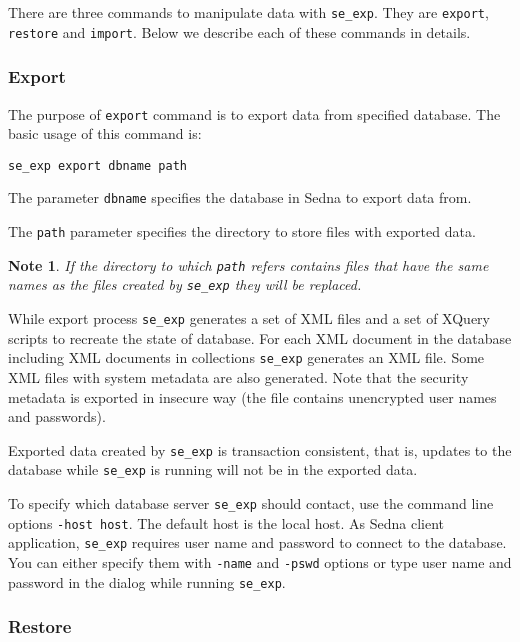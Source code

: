 \documentclass[a4paper,12pt]{article}
\newtheorem{note}{Note}    %
\begin{document}
There are three commands to manipulate data with \verb!se_exp!. They are
\verb!export!, \verb!restore! and \verb!import!. Below we describe each of these
commands in details.


\subsubsection*{Export}

The purpose of \verb!export! command is to export data from specified database.
The basic usage of this command is:

\begin{verbatim}
se_exp export dbname path
\end{verbatim}

The parameter \verb!dbname! specifies the database in Sedna to export data from.

The \verb!path! parameter specifies the directory to store files with exported
data.

\begin{note}
If the directory to which \verb!path! refers contains files that have the same
names as the files created by \verb!se_exp! they will be replaced.
\end{note}

While export process \verb!se_exp! generates a set of XML files and a set of
XQuery scripts to recreate the state of database. For each XML document in the
database including XML documents in collections \verb!se_exp! generates an XML
file. Some XML files with system metadata are also generated. Note that the
security metadata is exported in insecure way (the file contains unencrypted
user names and passwords).

Exported data created by \verb!se_exp! is transaction consistent, that is,
updates to the database while \verb!se_exp! is running will not be in the
exported data.

To specify which database server \verb!se_exp! should contact, use the command
line options \verb!-host host!. The default host is the local host. As Sedna
client application, \verb!se_exp! requires user name and password to connect to
the database. You can either specify them with \verb!-name! and \verb!-pswd!
options or type user name and password in the dialog while running
\verb!se_exp!.


\subsubsection*{Restore}
\end{document}

